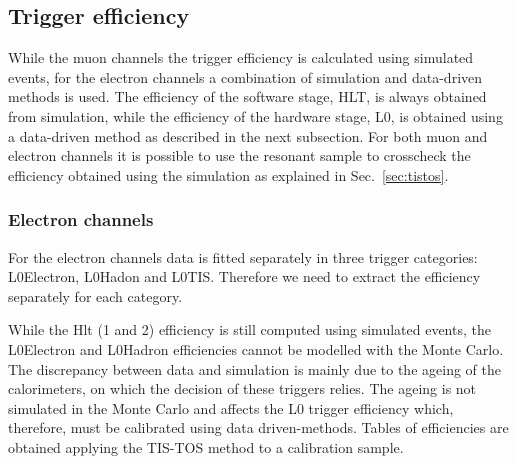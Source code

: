 \subsection{Trigger efficiency}
\label{sec:RKst_trigger_eff}

While the muon channels the trigger efficiency is calculated using simulated events,
for the electron channels a combination of simulation and data-driven methods is used.
The efficiency of the software stage, HLT, is always obtained from simulation,
while the efficiency of the hardware stage, L0, is obtained using a data-driven method
as described in the next subsection.
For both muon and electron channels it is possible to use the resonant sample to crosscheck
the efficiency obtained using the simulation as explained in Sec.~\ref{sec:tistos}.

\subsubsection{Electron channels}
\label{sec:RKst_trigee}

For the electron channels data is fitted separately in three trigger categories: L0Electron, L0Hadon and L0TIS.
Therefore we need to extract the efficiency separately for each category.

While the Hlt (1 and 2) efficiency is still computed using simulated events,
the L0Electron and L0Hadron efficiencies cannot be modelled with the Monte Carlo.
The discrepancy between data and simulation is mainly due to the ageing of the 
calorimeters, on which the decision of these triggers relies. The ageing is not simulated
in the Monte Carlo and affects the L0 trigger efficiency which, therefore, must
be calibrated using data driven-methods. Tables of efficiencies are obtained
applying the TIS-TOS method to a calibration sample.

